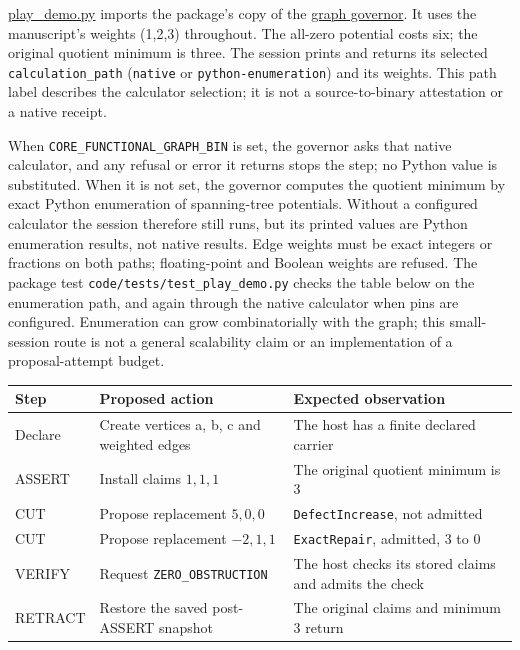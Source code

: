 \documentclass[
  11pt,
]{article}
\newcommand{\passthrough}[1]{#1}
\begin{document}
\href{code/play_demo.py}{play\_demo.py} imports the package's copy of
the \href{code/l1_symbol_game_governor.py}{graph governor}. It uses the
manuscript's weights (1,2,3) throughout. The all-zero potential costs
six; the original quotient minimum is three. The session prints and
returns its selected \nolinkurl{calculation_path}
(\passthrough{\lstinline!native!} or \nolinkurl{python-enumeration}) and
its weights. This path label describes the calculator selection; it is
not a source-to-binary attestation or a native receipt.

When \nolinkurl{CORE_FUNCTIONAL_GRAPH_BIN} is set, the governor asks
that native calculator, and any refusal or error it returns stops the
step; no Python value is substituted. When it is not set, the governor
computes the quotient minimum by exact Python enumeration of
spanning-tree potentials. Without a configured calculator the session
therefore still runs, but its printed values are Python enumeration
results, not native results. Edge weights must be exact integers or
fractions on both paths; floating-point and Boolean weights are refused.
The package test \nolinkurl{code/tests/test_play_demo.py} checks the
table below on the enumeration path, and again through the native
calculator when pins are configured. Enumeration can grow
combinatorially with the graph; this small-session route is not a
general scalability claim or an implementation of a proposal-attempt
budget.

\begin{longtable}[]{@{}
  >{\raggedright\arraybackslash}p{}
  >{\raggedright\arraybackslash}p{}
  >{\raggedright\arraybackslash}p{}@{}}
\toprule\noalign{}
\begin{minipage}[b]{\linewidth}\raggedright
Step
\end{minipage} & \begin{minipage}[b]{\linewidth}\raggedright
Proposed action
\end{minipage} & \begin{minipage}[b]{\linewidth}\raggedright
Expected observation
\end{minipage} \\
\midrule\noalign{}
\endhead
\bottomrule\noalign{}
\endlastfoot
Declare & Create vertices a, b, c and weighted edges & The host has a
finite declared carrier \\
ASSERT & Install claims \(1,\allowbreak 1,\allowbreak 1\) & The original
quotient minimum is 3 \\
CUT & Propose replacement \(5,\allowbreak 0,\allowbreak 0\) &
\nolinkurl{DefectIncrease}, not admitted \\
CUT & Propose replacement \(-2,\allowbreak 1,\allowbreak 1\) &
\passthrough{\lstinline!ExactRepair!}, admitted, 3 to 0 \\
VERIFY & Request \nolinkurl{ZERO_OBSTRUCTION} & The host checks its
stored claims and admits the check \\
RETRACT & Restore the saved post-ASSERT snapshot & The original claims
and minimum 3 return \\
\end{longtable}
\end{document}
